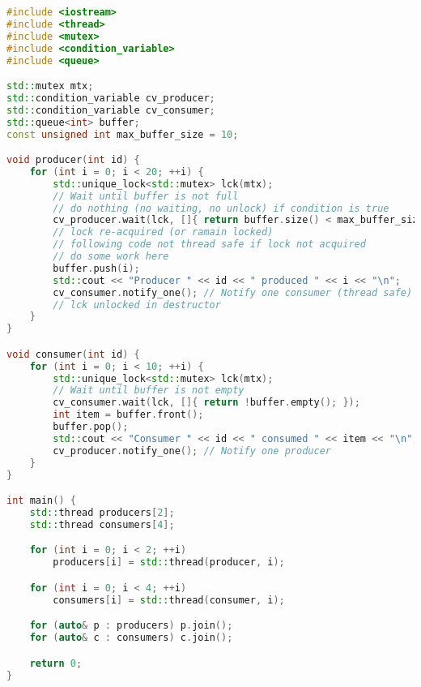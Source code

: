 \begin{lstlisting}[language=cpp]
#include <iostream>
#include <thread>
#include <mutex>
#include <condition_variable>
#include <queue>

std::mutex mtx;
std::condition_variable cv_producer;
std::condition_variable cv_consumer;
std::queue<int> buffer;
const unsigned int max_buffer_size = 10;

void producer(int id) {
    for (int i = 0; i < 20; ++i) {
        std::unique_lock<std::mutex> lck(mtx);
        // Wait until buffer is not full
        // do nothing (no waiting, no unlock) if condition is true
        cv_producer.wait(lck, []{ return buffer.size() < max_buffer_size; });
        // lock re-acquired (or ramain locked)
        // following code not thread safe if lock not acquired
        // do some work here
        buffer.push(i);
        std::cout << "Producer " << id << " produced " << i << "\n";
        cv_consumer.notify_one(); // Notify one consumer (thread safe)
        // lck unlocked in destructor
    }
}

void consumer(int id) {
    for (int i = 0; i < 10; ++i) {
        std::unique_lock<std::mutex> lck(mtx);
        // Wait until buffer is not empty
        cv_consumer.wait(lck, []{ return !buffer.empty(); });
        int item = buffer.front();
        buffer.pop();
        std::cout << "Consumer " << id << " consumed " << item << "\n";
        cv_producer.notify_one(); // Notify one producer
    }
}

int main() {
    std::thread producers[2];
    std::thread consumers[4];

    for (int i = 0; i < 2; ++i)
        producers[i] = std::thread(producer, i);

    for (int i = 0; i < 4; ++i)
        consumers[i] = std::thread(consumer, i);

    for (auto& p : producers) p.join();
    for (auto& c : consumers) c.join();

    return 0;
}
\end{lstlisting}

